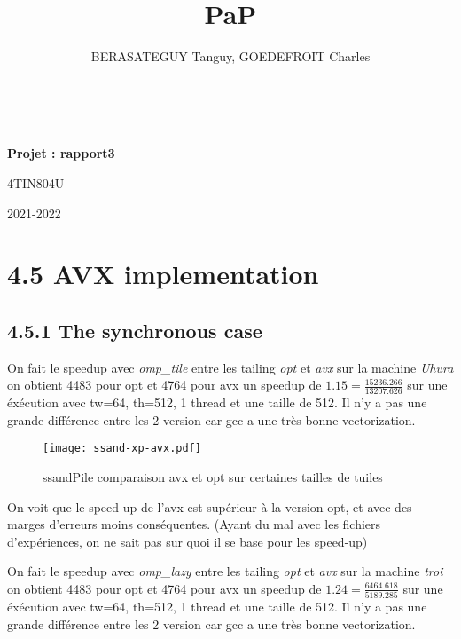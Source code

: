 \documentclass[10pt, a4paper]{article}
\title{PaP}
\author{BERASATEGUY Tanguy, GOEDEFROIT Charles}
\begin{document}
\begin{titlepage}
  \centering
  \ {} %
  \vfill
  \vspace{1cm}
  {\scshape\LARGE\MyTitle\par}
  \vspace{0.5cm}
  {\huge\bfseries Projet : rapport3\par}
  \vspace{0.5cm}
  {\Large 4TIN804U\par}
  \vspace{1cm}
  \MyAuthor
  \vfill
  {\large2021-2022\par}
\end{titlepage}

\newpage

\tableofcontents

\newpage

\section{4.5 AVX implementation}

\subsection{4.5.1 The synchronous case}

On fait le speedup avec \emph{omp\_tile} entre les tailing \emph{opt} et \emph{avx} sur la machine
\emph{Uhura} on obtient 4483 pour opt et 4764 pour avx un speedup de $1.15 =\frac{15236.266}{13207.626}$
sur une éxécution avec tw=64, th=512, 1 thread et une taille de 512.
Il n'y a pas une grande différence entre les 2 version car gcc a une très bonne vectorization.

\begin{figure}[H]
  \centering
  \texttt{[image: ssand-xp-avx.pdf]}
  \caption{\small{ssandPile comparaison avx et opt sur certaines tailles de tuiles}}
\end{figure}

On voit que le speed-up de l'avx est supérieur à la version opt, et avec des marges d'erreurs
moins conséquentes.
(Ayant du mal avec les fichiers d'expériences, on ne sait pas sur quoi il se base pour les speed-up)

On fait le speedup avec \emph{omp\_lazy} entre les tailing \emph{opt} et \emph{avx} sur la machine
\emph{troi} on obtient 4483 pour opt et 4764 pour avx un speedup de $1.24 =\frac{6464.618}{5189.285}$
sur une éxécution avec tw=64, th=512, 1 thread et une taille de 512.
Il n'y a pas une grande différence entre les 2 version car gcc a une très bonne vectorization.
\end{document}
